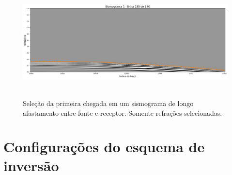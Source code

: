 \begin{figure}[H]
	\centering
	\includegraphics[width=16cm,height=6cm]{Imgs/Metodologia/linha135_sismo1.png}
	\caption{Seleção da primeira chegada em um sismograma de longo afastamento entre fonte e receptor. Somente refrações selecionadas.}
	\label{fig:gather_picking_far}	
\end{figure}




\section{Configurações do esquema de inversão}








